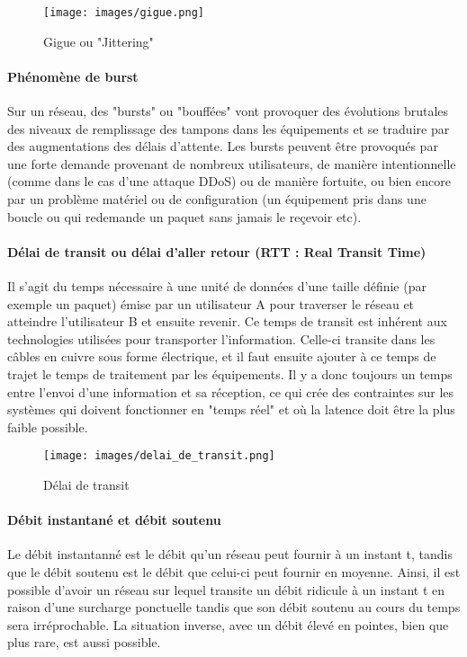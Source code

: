 \documentclass[french]{article}
\begin{document}
\begin{figure}[h]
	\texttt{[image: images/gigue.png]}
	\caption{Gigue ou "Jittering"}
	\label{fig:gigue_jittering}
\end{figure} 

\paragraph{Phénomène de burst}

Sur un réseau, des "bursts" ou "bouffées" vont provoquer des évolutions brutales des niveaux de remplissage des tampons dans les équipements et se traduire par des augmentations des délais d'attente.
Les bursts peuvent être provoqués par une forte demande provenant de nombreux utilisateurs, de manière intentionnelle (comme dans le cas d'une attaque DDoS) ou de manière fortuite, ou bien encore par un problème matériel ou de configuration (un équipement pris dans une boucle ou qui redemande un paquet sans jamais le reçevoir etc).

\paragraph{Délai de transit ou délai d'aller retour (RTT : Real Transit Time)}

Il s'agit du temps nécessaire à une unité de données d'une taille définie (par exemple un paquet) émise par un utilisateur A pour traverser le réseau et atteindre l'utilisateur B et ensuite revenir.
Ce temps de transit est inhérent aux technologies utilisées pour transporter l'information. Celle-ci transite dans les câbles en cuivre sous forme électrique, et il faut ensuite ajouter à ce temps de trajet le temps de traitement par les équipements. Il y a donc toujours un temps entre l'envoi d'une information et sa réception, ce qui crée des contraintes sur les systèmes qui doivent fonctionner en "temps réel" et où la latence doit être la plus faible possible.

\begin{figure}[h]
	\texttt{[image: images/delai\_de\_transit.png]}
	\caption{Délai de transit}
	\label{fig:delai_de_transit}
\end{figure} 

\paragraph{Débit instantané et débit soutenu}

Le débit instantanné est le débit qu'un réseau peut fournir à un instant t, tandis que le débit soutenu est le débit que celui-ci peut fournir en moyenne.
Ainsi, il est possible d'avoir un réseau sur lequel transite un débit ridicule à un instant t en raison d'une surcharge ponctuelle tandis que son débit soutenu au cours du temps sera irréprochable. La situation inverse, avec un débit élevé en pointes, bien que plus rare, est aussi possible.
\end{document}
